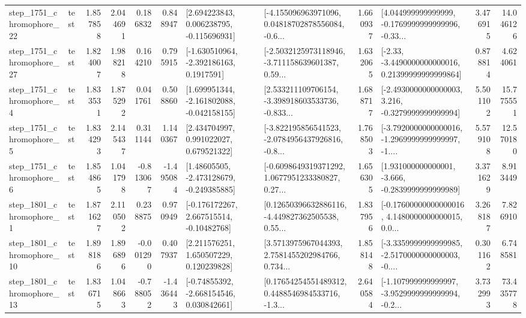 \begin{tabular}{llrrrrllrlrr}
 step\_1751\_chromophore\_22 &      test &      1.857858 &    2.044691 &      0.186832 &  0.848947 &    [2.694223843, 0.006238795, -0.115696931] &  [-4.155096963971096, 0.04818702878556084, -0.6... &       1.660937 &  [4.044999999999999, -0.1769999999999996, -0.33... &            3.476915 &         14.046126 \\
 step\_1751\_chromophore\_27 &      test &      1.824007 &    1.988218 &      0.164210 &  0.795915 &     [-1.630510964, -2.392186163, 0.1917591] &  [-2.5032125973118946, -3.711158639601387, 0.59... &       1.632065 &  [-2.33, -3.4490000000000016, 0.21399999999999864] &            0.878814 &          4.624061 \\
  step\_1751\_chromophore\_4 &      test &      1.833531 &    1.875292 &      0.041761 &  0.508860 &   [1.699951344, -2.161802088, -0.042158155] &  [2.533211109706154, -3.398918603533736, -0.833... &       1.688717 &  [-2.4930000000000003, 3.216, -0.3279999999999994] &            5.501102 &         15.775551 \\
  step\_1751\_chromophore\_5 &      test &      1.834293 &    2.145437 &      0.311144 &  1.140367 &     [2.434704997, 0.991022027, 0.679521322] &  [-3.822195856541523, -2.0784956437926816, -0.8... &       1.768503 &  [-3.7920000000000016, -1.2969999999999997, -1.... &            5.579108 &         12.570180 \\
  step\_1751\_chromophore\_6 &      test &      1.854865 &    1.041798 &     -0.813067 & -1.495084 &    [1.48605505, -2.473128679, -0.249385885] &  [-0.6098649319371292, 1.0677951233380827, 0.27... &       1.656305 &   [1.931000000000001, -3.666, -0.2839999999999989] &            3.371629 &          8.913449 \\
  step\_1801\_chromophore\_1 &      test &      1.871627 &    2.110502 &      0.238875 &  0.970949 &    [-0.176172267, 2.667515514, -0.10482768] &  [0.12650396632886116, -4.449827362505538, 0.55... &       1.837956 &  [-0.17600000000000016, 4.1480000000000015, 0.0... &            3.268187 &          7.826910 \\
 step\_1801\_chromophore\_10 &      test &      1.898186 &    1.896896 &     -0.001290 &  0.407937 &     [2.211576251, 1.650507229, 0.120239828] &  [3.5713975967044393, 2.7581455202984766, 0.734... &       1.858148 &  [-3.3359999999999985, -2.5170000000000003, -0.... &            0.301162 &          6.748581 \\
 step\_1801\_chromophore\_13 &      test &      1.836715 &    1.048663 &     -0.788052 & -1.436443 &    [-0.74855392, -2.668154546, 0.030842661] &  [0.17654254551489312, 0.4488546984533716, -1.3... &       2.640584 &  [-1.107999999999997, -3.9529999999999994, -0.2... &            3.732993 &         73.435778 \\

\end{tabular}
